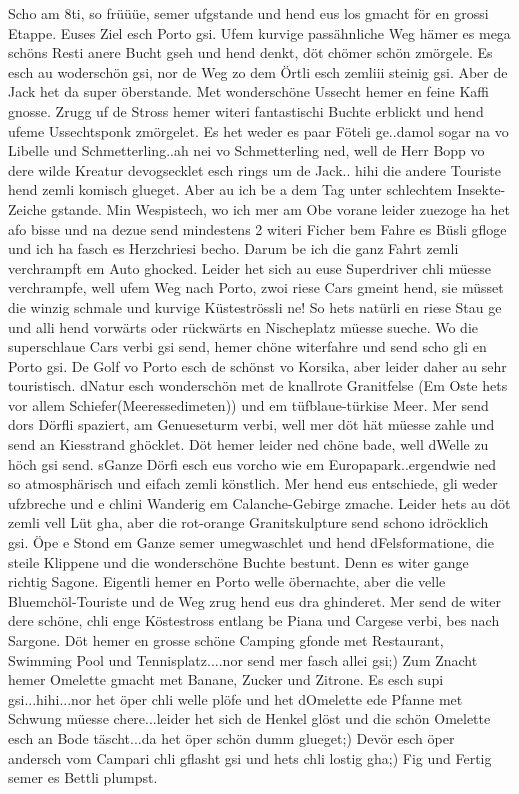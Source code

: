 Scho am 8ti, so früüüe, semer ufgstande und hend eus los gmacht för en grossi Etappe.
Euses Ziel esch Porto gsi.
Ufem kurvige passähnliche Weg hämer es mega schöns Resti anere Bucht gseh und hend denkt, döt chömer schön zmörgele.
Es esch au woderschön gsi, nor de Weg zo dem Örtli esch zemliii steinig gsi.
Aber de Jack het da super öberstande.
Met wonderschöne Ussecht hemer en feine Kaffi gnosse.
Zrugg uf de Stross hemer witeri fantastischi Buchte erblickt und hend ufeme Ussechtsponk zmörgelet.
Es het weder es paar Föteli ge..damol sogar na vo Libelle und Schmetterling..ah nei vo Schmetterling ned, well de Herr Bopp vo dere wilde Kreatur devogsecklet esch rings um de Jack..
hihi die andere Touriste hend zemli komisch glueget.
Aber au ich be a dem Tag unter schlechtem Insekte-Zeiche gstande.
Min Wespistech, wo ich mer am Obe vorane leider zuezoge ha het afo bisse und na dezue send mindestens 2 witeri Ficher bem Fahre es Büsli gfloge und ich ha fasch es Herzchriesi becho.
Darum be ich die ganz Fahrt zemli verchrampft em Auto ghocked.
Leider het sich au euse Superdriver chli müesse verchrampfe, well ufem Weg nach Porto, zwoi riese Cars gmeint hend, sie müsset die winzig schmale und kurvige Küsteströssli ne! So hets natürli en riese Stau ge und alli hend vorwärts oder rückwärts en Nischeplatz müesse sueche.
Wo die superschlaue Cars verbi gsi send, hemer chöne witerfahre und send scho gli en Porto gsi.
De Golf vo Porto esch de schönst vo Korsika, aber leider daher au sehr touristisch.
dNatur esch wonderschön met de knallrote Granitfelse (Em Oste hets vor allem Schiefer(Meeressedimeten)) und em tüfblaue-türkise Meer.
Mer send dors Dörfli spaziert, am Genueseturm verbi, well mer döt hät müesse zahle und send an Kiesstrand ghöcklet.
Döt hemer leider ned chöne bade, well dWelle zu höch gsi send.
sGanze Dörfi esch eus vorcho wie em Europapark..ergendwie ned so atmosphärisch und eifach zemli könstlich.
Mer hend eus entschiede, gli weder ufzbreche und e chlini Wanderig em Calanche-Gebirge zmache.
Leider hets au döt zemli vell Lüt gha, aber die rot-orange Granitskulpture send schono idröcklich gsi.
Öpe e Stond em Ganze semer umegwaschlet und hend dFelsformatione, die steile Klippene und die wonderschöne Buchte bestunt.
Denn es witer gange richtig Sagone.
Eigentli hemer en Porto welle öbernachte, aber die velle Bluemchöl-Touriste und de Weg zrug hend eus dra ghinderet.
Mer send de witer dere schöne, chli enge Köstestross entlang be Piana und Cargese verbi, bes nach Sargone.
Döt hemer en grosse schöne Camping gfonde met Restaurant, Swimming Pool und Tennisplatz....nor send mer fasch allei gsi;) Zum Znacht hemer Omelette gmacht met Banane, Zucker und Zitrone.
Es esch supi gsi...hihi...nor het öper chli welle plöfe und het dOmelette ede Pfanne met Schwung müesse chere...leider het sich de Henkel glöst und die schön Omelette esch an Bode täscht...da het öper schön dumm glueget;) Devör esch öper andersch vom Campari chli gflasht gsi und hets chli lostig gha;) Fig und Fertig semer es Bettli plumpst.

